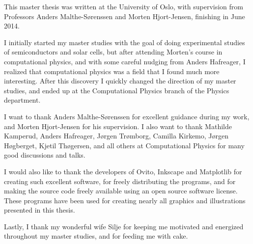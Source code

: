 \begin{acknowledgements}
This master thesis was written at the University of Oslo, with supervision from Professors Anders Malthe-Sørenssen and Morten Hjort-Jensen, finishing in June 2014.

I initially started my master studies with the goal of doing experimental studies of semiconductors and solar cells, but after attending Morten's course in computational physics, and with some careful nudging from Anders Hafreager, I realized that computational physics was a field that I found much more interesting. After this discovery I quickly changed the direction of my master studies, and ended up at the Computational Physics branch of the Physics department.

I want to thank Anders Malthe-Sørenssen for excellent guidance during my work, and Morten Hjort-Jensen for his supervision. I also want to thank Mathilde Kamperud, Anders Hafreager, Jørgen Trømborg, Camilla Kirkemo, Jørgen Høgberget, Kjetil Thøgersen, and all others at Computational Physics for many good discussions and talks.

I would also like to thank the developers of Ovito\cite{stukowski2010ovito}, Inkscape\cite{webinkscape} and Matplotlib for creating such excellent software, for freely distributing the programs, and for making the source code freely available using an open source software license. These programs have been used for creating nearly all graphics and illustrations presented in this thesis.

Lastly, I thank my wonderful wife Silje for keeping me motivated and energized throughout my master studies, and for feeding me with cake.



\end{acknowledgements}
